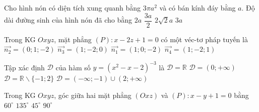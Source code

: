 \begin{ex}%
	Cho hình nón có diện tích xung quanh bằng $3 \pi a^2$ và có bán kính đáy bằng $a$. Độ dài đường sinh của hình nón đã cho bằng
	\choice
	{$2a$}
	{$\dfrac{3a}{2}$}
	{$2\sqrt{2}a$}
	{\True $3a$}
\end{ex}

\begin{ex}%
	Trong KG $Oxyz$, mặt phẳng $(P)\colon x-2z+1=0$ có một véc-tơ pháp tuyến là
	\choice
	{$\overrightarrow{n_2}=(0;1;-2)$}
	{$\overrightarrow{n_3}=(1;-2;0)$}
	{\True $\overrightarrow{n_1}=(1;0;-2)$}
	{$\overrightarrow{n_4}=(1;-2;1)$}
\end{ex}

\begin{ex}%
	Tập xác định $\mathscr{D}$ của hàm số $y=\left(x^2-x-2\right)^{-3}$ là
	\choice
	{$\mathscr{D}=\mathbb{R}$}
	{$\mathscr{D}=(0;+\infty)$}
	{\True $\mathscr{D}=\mathbb{R}\backslash\{-1;2\}$}
	{$\mathscr{D}=(-\infty;-1) \cup(2 ;+\infty)$}
\end{ex}

\begin{ex}%
	Trong KG $Oxyz$, góc giữa hai mặt phẳng $(Oxz)$ và $(P)\colon x-y+1=0$ bằng
	\choice
	{$60^{\circ}$}
	{$135^{\circ}$}
	{\True $45^{\circ}$}
	{$90^{\circ}$}
\end{ex}


